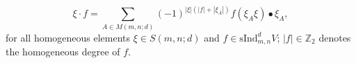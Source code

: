 \documentclass[12pt,reqno]{amsart}
\theoremstyle{definition}
\theoremstyle{remark}
\newcommand{\ind}{\mathrm{sInd}_{m,n}^{d}}
\DeclareMathOperator{\sign}{sign}
\begin{document}
$$\xi\cdot f= \sum_{A\in M(m,n;d)} (-1)^{|\xi|(|f|+|\xi_{A}|)}f(\xi_{A}\xi)\bullet\xi_A,$$
for all homogeneous elements $\xi\in S(m,n;d)$ and  $f\in\ind V$; $|f|\in\mathbb{Z}_2$ denotes the homogeneous degree of $f$. 

    
\end{document}
